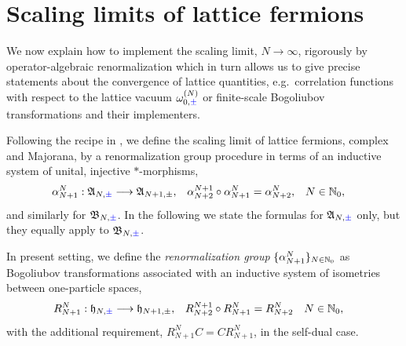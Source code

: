 \documentclass[a4paper, 11pt]{article}
\newcommand{\fA}{\mathfrak{A}}\newcommand{\cA}{\mathcal{A}}\newcommand{\dA}{\mathds{A}}\newcommand{\sA}{\mathscr{A}}
\newcommand{\fB}{\mathfrak{B}}\newcommand{\cB}{\mathcal{B}}\newcommand{\dB}{\mathds{B}}\newcommand{\sB}{\mathscr{B}}
\newcommand{\fh}{\mathfrak{h}}
\DeclareMathOperator{\1}{\mathds{1}}
\begin{document}
\section{Scaling limits of lattice fermions}
\label{sec:ffscaling}
We now explain how to implement the scaling limit, $N\rightarrow\infty$, rigorously by operator-algebraic renormalization \cite{StottmeisterOperatorAlgebraicRenormalization, BrothierAnOperatorAlgebraic} which in turn allows us to give precise statements about the convergence of lattice quantities, e.g.~correlation functions with respect to the lattice vacuum $\omega^{(N)}_{0,{\color{blue}\pm}}$ or finite-scale Bogoliubov transformations and their implementers.
 
Following the recipe in \cite{MorinelliScalingLimitsOf}, we define the scaling limit of lattice fermions, complex and Majorana, by a renormalization group procedure in terms of an inductive system of unital, injective $*$-morphisms,
\begin{align}
\label{eq:rgF}
\alpha^{N}_{N+1} : \fA_{N,{\color{blue}\pm}} & \longrightarrow \fA_{N+1,\pm}, & \alpha^{N+1}_{N+2}\circ\alpha^{N}_{N+1} & = \alpha^{N}_{N+2} , & N & \in\N_{0},
\end{align}
and similarly for $\fB_{N,{\color{blue}\pm}}$. In the following we state the formulas for $\fA_{N,{\color{blue}\pm}}$ only, but they equally apply to $\fB_{N,{\color{blue}\pm}}$.

In present setting, we define the \textit{renormalization group} $\{\alpha^{N}_{N+1}\}_{N\in\mathbb{N}_{0}}$ as Bogoliubov transformations associated with an inductive system of isometries between one-particle spaces,
\begin{align}
\label{eq:rgH}
R^{N}_{N+1} : \fh_{N,{\color{blue}\pm}} & \longrightarrow \fh_{N+1,\pm}, & R^{N+1}_{N+2}\circ R^{N}_{N+1} & = R^{N}_{N+2} & N & \in\N_{0},
\end{align}
with the additional requirement, $R^{N}_{N+1}C = CR^{N}_{N+1}$, in the self-dual case.
\end{document}
